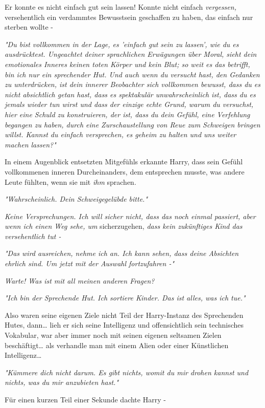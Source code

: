{Er konnte es nicht einfach gut sein lassen! Konnte nicht einfach \emph{vergessen,} versehentlich ein verdammtes Bewusstsein geschaffen zu haben, das einfach nur sterben wollte -

\emph{"Du bist vollkommen in der Lage, es 'einfach gut sein zu lassen', wie du es ausdrücktest. Ungeachtet deiner sprachlichen Erwägungen über Moral, sieht dein emotionales Inneres keinen toten Körper und kein Blut; so weit es das betrifft, bin ich nur ein sprechender Hut. Und auch wenn du versucht hast, den Gedanken zu unterdrücken, ist dein innerer Beobachter sich vollkommen bewusst, dass du es nicht absichtlich getan hast, dass es spektakulär unwahrscheinlich ist, dass du es jemals wieder tun wirst und dass der einzige echte Grund, warum du versuchst, hier eine Schuld zu konstruieren, der ist, dass du dein Gefühl, eine Verfehlung begangen zu haben, durch eine Zurschaustellung von Reue zum Schweigen bringen willst. Kannst du einfach versprechen, es geheim zu halten und uns weiter machen lassen?"}

In einem Augenblick entsetzten Mitgefühls erkannte Harry, dass sein Gefühl vollkommenen inneren Durcheinanders, dem entsprechen musste, was andere Leute fühlten, wenn sie mit \emph{ihm} sprachen.

\emph{"Wahrscheinlich. Dein Schweigegelübde bitte."}

\emph{Keine Versprechungen. Ich will sicher nicht, dass das noch einmal passiert, aber wenn ich einen Weg sehe, um} sicherzugehen, \emph{dass kein zukünftiges Kind das versehentlich tut -}

\emph{"Das wird ausreichen, nehme ich an. Ich kann sehen, dass deine Absichten ehrlich sind. Um jetzt mit der Auswahl fortzufahren -"}

\emph{Warte! Was ist mit all meinen anderen Fragen?}

\emph{"Ich bin der Sprechende Hut. Ich sortiere Kinder. Das ist alles, was ich tue."}

Also waren seine eigenen Ziele nicht Teil der Harry-Instanz des Sprechenden Hutes, dann… lieh er sich seine Intelligenz und offensichtlich sein technisches Vokabular, war aber immer noch mit seinen eigenen seltsamen Zielen beschäftigt… als verhandle man mit einem Alien oder einer Künstlichen Intelligenz…

\emph{"Kümmere dich nicht darum. Es gibt nichts, womit du mir drohen kannst und nichts, was du mir anzubieten hast."}

Für einen kurzen Teil einer Sekunde dachte Harry -

}
